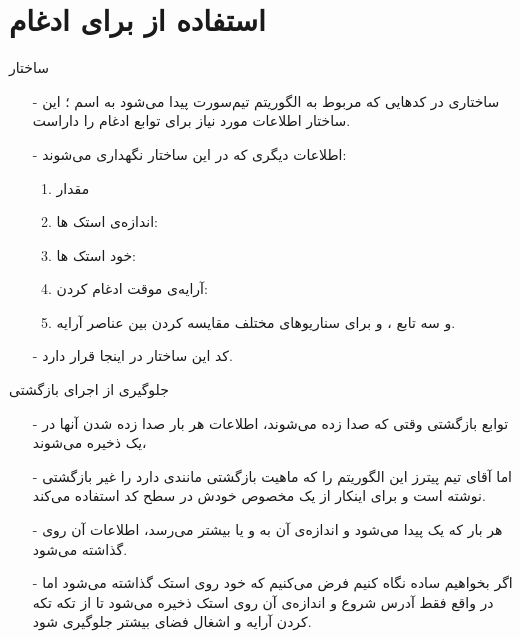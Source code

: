 \section{استفاده از  برای ادغام}
\begin{frame}{ساختار }
\begin{itemize}\itemr
\item[-]
ساختاری در کد‌هایی که مربوط به الگوریتم تیم‌سورت پیدا می‌شود به اسم ؛ این ساختار اطلاعات مورد نیاز برای توابع ادغام را داراست.

\item[-]
اطلاعات دیگری که در این ساختار نگهداری می‌شوند:
\begin{enumerate}\itemr
\item 
مقدار 

\item 
اندازه‌ی استک ها:

\item 
خود استک ها:

\item 
آرایه‌ی موقت ادغام کردن:

\item 
و سه تابع
،
 و
برای سناریو‌های مختلف مقایسه کردن بین عناصر آرایه.
\end{enumerate}
\vspace{-15pt}
\item[-]
کد این ساختار در اینجا
قرار دارد.
\end{itemize}
\end{frame}

\begin{frame}{جلوگیری از اجرای بازگشتی}
\begin{itemize}\itemr
\item[-]
توابع بازگشتی وقتی که صدا زده می‌شوند، اطلاعات هر بار صدا زده شدن آنها در یک  ذخیره می‌شوند،

\item[-]
اما آقای تیم پیترز این الگوریتم را که ماهیت بازگشتی مانندی دارد را غیر بازگشتی نوشته است و برای اینکار از یک  مخصوص خودش در سطح کد استفاده می‌کند.

\item[-]
هر بار که یک  پیدا می‌شود و اندازه‌ی آن به  و یا بیشتر می‌رسد، اطلاعات آن روی  گذاشته می‌شود.

\item[-]
اگر بخواهیم ساده نگاه کنیم فرض می‌کنیم که خود  روی استک گذاشته می‌شود اما در واقع فقط آدرس شروع و اندازه‌ی آن روی استک ذخیره می‌شود تا از تکه تکه کردن آرایه و اشغال فضای بیشتر جلوگیری شود.
\end{itemize}
\end{frame}

